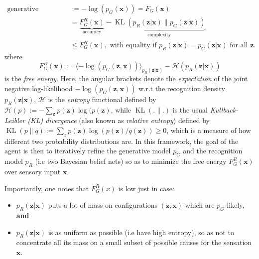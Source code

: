 \documentclass[10pt,letterpaper]{article}
\def\z{\mathbf{z}}
\def\x{\mathbf{x}}
\begin{document}
\begin{equation}
  \begin{split}
    \text{generative surprise } &:= -\log(p_G(\x)) = F_G(\x) \\
    &=\underbrace{F^R_G(\x)}_{\text{accuracy}} - \underbrace{\operatorname{{KL}}(p_R(\z|\x) \| p_G(\z|\x))}_{\text{complexity}} \\
    &\le F^R_G(\x),
    \text{ with equality if }p_R(\z|\x) = p_G(\z|\x)\text{ for all } \z.
  \end{split}
\end{equation}
where
\begin{equation}
  F_G^R(\x) := \langle -\log(p_G(\z, \x))\rangle_{p_R(\z|\x)} - \mathcal H(p_R(\z|\x))
\end{equation}
is the \textit{free energy}.
Here, the angular brackets denote the \textit{expectation} of the joint negative log-likelihood $-\log(p_G(\z, \x))$ w.r.t the recognition density $p_R(\z|\x)$, $\mathcal H$ is the \textit{entropy} functional defined by $\mathcal H(p) := -\sum_{\z}p(\z)\log(p(\z)$, while $\operatorname{KL}(.\|.)$ is the usual \textit{Kullback-Leibler (KL) divergence} (also known as \textit{relative entropy}) defined by $\operatorname{KL}(p\|q) := \sum_{z}p(\z)\log(p(\z)/q(\z)) \ge 0$,
which is a measure of how different two probability distributions are. In this framework, the goal of the agent is then to iteratively refine the generative model $p_G$ and the recognition model $p_R$ (i.e two Bayesian belief nets) so as to minimize the free energy $F_G^R(\x)$ over sensory input $\x$.

Importantly, one notes that $F^R_G(x)$ is low just in case:
\begin{itemize}
\item  $p_R(\z|\x)$ puts a lot of mass on configurations $(\z,\x)$ which are $p_G$-likely, %
  \textbf{and}
\item $p_R(\z|\x)$ is as uniform as possible (i.e have high entropy), so as not to concentrate
  all its mass on a small subset of possible causes for the sensation $\x$.
  \end{itemize}
\end{document}
